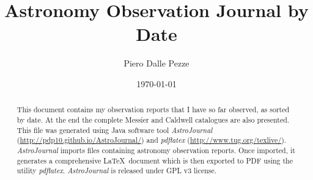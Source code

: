 \documentclass[10pt,twoside,a4paper,english]{article}
\title{Astronomy Observation Journal by Date}
\author{Piero Dalle Pezze}
\date{\today}
\begin{document}
\maketitle
\thispagestyle{empty}

\begin{abstract}
This document contains my observation reports that I have so far observed, as sorted by date. At the end the complete Messier and Caldwell catalogues are also presented. This file was generated using Java software tool {\it AstroJournal} (\href{http://pdp10.github.io/AstroJournal/}{http://pdp10.github.io/AstroJournal/}) and {\it pdflatex} (\href{http://www.tug.org/texlive/}{http://www.tug.org/texlive/}). {\it AstroJournal} imports files containing astronomy observation reports. Once imported, it generates a comprehensive \LaTeX\ document which is then exported to PDF using the utility {\it pdflatex}. {\it AstroJournal} is released under GPL v3 license.
\end{abstract}


\tableofcontents

\clearpage
{}


\small

\clearpage


\normalsize
\end{document}

